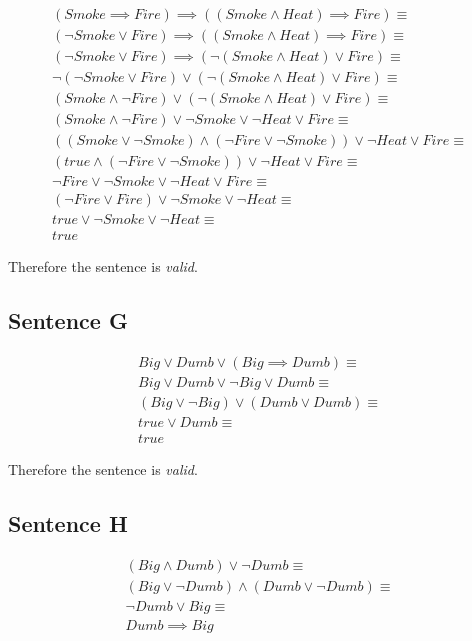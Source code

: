 \begin{gather*}
(Smoke \implies Fire) \implies ((Smoke \land Heat) \implies Fire) \equiv \\
(\neg Smoke \lor Fire) \implies ((Smoke \land Heat) \implies Fire) \equiv \\
(\neg Smoke \lor Fire) \implies (\neg (Smoke \land Heat) \lor Fire) \equiv \\
\neg (\neg Smoke \lor Fire) \lor (\neg (Smoke \land Heat) \lor Fire) \equiv \\
(Smoke \land \neg Fire) \lor (\neg (Smoke \land Heat) \lor Fire) \equiv \\
(Smoke \land \neg Fire) \lor \neg Smoke \lor \neg Heat \lor Fire \equiv \\
((Smoke \lor \neg Smoke) \land (\neg Fire \lor \neg Smoke)) \lor \neg Heat \lor Fire \equiv \\
(true \land (\neg Fire \lor \neg Smoke)) \lor \neg Heat \lor Fire \equiv \\
\neg Fire \lor \neg Smoke \lor \neg Heat \lor Fire \equiv \\
(\neg Fire \lor Fire) \lor \neg Smoke \lor \neg Heat \equiv \\
true \lor \neg Smoke \lor \neg Heat \equiv \\
true
\end{gather*}

Therefore the sentence is \textit{valid}.

\subsection*{Sentence G}

\begin{gather*}
Big \lor Dumb \lor (Big \implies Dumb) \equiv \\
Big \lor Dumb \lor \neg Big \lor Dumb \equiv \\
(Big \lor \neg Big) \lor (Dumb \lor Dumb) \equiv \\
true \lor Dumb \equiv \\
true
\end{gather*}

Therefore the sentence is \textit{valid}.

\subsection*{Sentence H}

\begin{gather*}
(Big \land Dumb) \lor \neg Dumb \equiv \\
(Big \lor \neg Dumb) \land (Dumb \lor \neg Dumb) \equiv \\
\neg Dumb \lor Big \equiv \\
Dumb \implies Big
\end{gather*}


